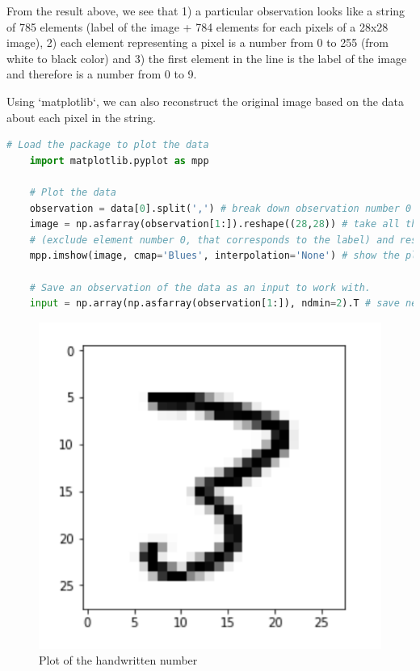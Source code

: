 From the result above, we see that 1) a particular observation looks like a string of 785 elements (label of the image + 784 elements for each pixels of a 28x28 image), 2) each element representing a pixel is a number from 0 to 255 (from white to black color) and 3) the first element in the line is the label of the image and therefore is a number from 0 to 9.

Using `matplotlib`, we can also reconstruct the original image based on the data about each pixel in the string.

\begin{lstlisting}[language=Python]
    # Load the package to plot the data
    import matplotlib.pyplot as mpp

    # Plot the data
    observation = data[0].split(',') # break down observation number 0 (comma is used to identify each element).
    image = np.asfarray(observation[1:]).reshape((28,28)) # take all the elements starting from the element 1 
    # (exclude element number 0, that corresponds to the label) and reshape them as an array with dimension 28 by 28.
    mpp.imshow(image, cmap='Blues', interpolation='None') # show the plot of this array using grey pallete.

    # Save an observation of the data as an input to work with.
    input = np.array(np.asfarray(observation[1:]), ndmin=2).T # save necessary elements in a vertical vector shape.
\end{lstlisting}

\begin{figure}[H]
   \includegraphics[width=\linewidth]{pics/3.png}
   \caption{\label{fig:number3} Plot of the handwritten number}
\end{figure}


